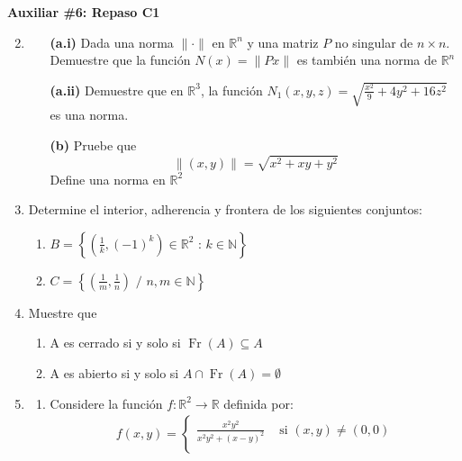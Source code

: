 \documentclass[letterpaper,11pt]{article}
\DeclareMathOperator{\fr}{Fr}
\newcommand{\norm}[1]{\lVert #1\rVert }
\begin{document}
\begin{center}
	\LARGE \bf{Auxiliar \#6: Repaso C1}\\
\end{center}

\vspace{-1cm}
\begin{enumerate}\setlength{\itemsep}{0.4cm}	
\item[]

\item
    \begin{enumerate}
        \item[\textbf{(a.i)}] Dada una norma $\norm{\cdot}$ en $\mathbb{R}^n$ y una matriz $P$ no singular de $n\times n$. Demuestre que la función $N(x)=\norm{Px}$ es también una norma de $\mathbb{R}^n$
        \item[\textbf{(a.ii)}] Demuestre que en $\mathbb{R}^3$, la función $\displaystyle N_1(x,y,z)=\sqrt{\frac{x^2}{9}+4y^2+16z^2}$ es una norma.
        \item[\textbf{(b)}] Pruebe que 
        \[\norm{(x,y)}=\sqrt{x^2+xy+y^2}\]
        Define una norma en $\mathbb{R}^2$
    \end{enumerate}
\item Determine el interior, adherencia y frontera de los siguientes conjuntos:
    \begin{enumerate}
        \item $B=\left\{\left(\frac{1}{k},(-1)^k\right)\in\mathbb{R}^2 \text{ : } k\in\mathbb{N} \right\}$
        \item $C=\left\{ \left(\frac{1}{m},\frac{1}{n}\right) \text{  / } n,m\in\mathbb{N}\right\}$
    \end{enumerate}
\item Muestre que
    \begin{enumerate}
        \item A es cerrado si y solo si $\fr{(A)}\subseteq A$
        \item A es abierto si y solo si $A\cap\fr(A)=\emptyset$
    \end{enumerate}
\item 
    \begin{enumerate}
        \item Considere la función $f:\mathbb{R}^2\rightarrow\mathbb{R}$ definida por:
        \begin{align*}
            \displaystyle f(x,y)=\left\{
                \begin{array}{cl}
                    \frac{x^2y^2}{x^2y^2+(x-y)^2} &\text{ si } (x,y)\neq(0,0)  \\

\end{array}
\end{align*}
\end{enumerate}
\end{enumerate}
\end{document}
